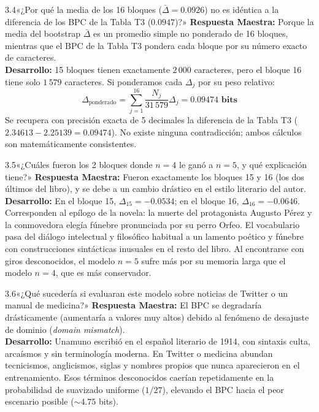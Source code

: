 \documentclass[11pt,letterpaper]{article}
\begin{document}
\begin{trapbox}{3.4}{«¿Por qué la media de los 16 bloques ($\bar{\Delta} = 0.0926$) no es idéntica a la diferencia de los BPC de la Tabla T3 ($0.0947$)?»}
\textbf{Respuesta Maestra:} Porque la media del bootstrap $\bar{\Delta}$ es un promedio simple no ponderado de 16 bloques, mientras que el BPC de la Tabla T3 pondera cada bloque por su número exacto de caracteres.\\[3pt]
\textbf{Desarrollo:} 15 bloques tienen exactamente $2\,000$ caracteres, pero el bloque 16 tiene solo $1\,579$ caracteres. Si ponderamos cada $\Delta_j$ por su peso relativo:
$$\Delta_{\text{ponderado}} = \sum_{j=1}^{16} \frac{N_j}{31\,579} \Delta_j = \mathbf{0.09474\text{ bits}}$$
Se recupera con precisión exacta de 5 decimales la diferencia de la Tabla T3 ($2.34613 - 2.25139 = 0.09474$). No existe ninguna contradicción; ambos cálculos son matemáticamente consistentes.
\end{trapbox}

\begin{trapbox}{3.5}{«¿Cuáles fueron los 2 bloques donde $n=4$ le ganó a $n=5$, y qué explicación tiene?»}
\textbf{Respuesta Maestra:} Fueron exactamente los bloques 15 y 16 (los dos últimos del libro), y se debe a un cambio drástico en el estilo literario del autor.\\[3pt]
\textbf{Desarrollo:} En el bloque 15, $\Delta_{15} = -0.0534$; en el bloque 16, $\Delta_{16} = -0.0646$. Corresponden al epílogo de la novela: la muerte del protagonista Augusto Pérez y la conmovedora elegía fúnebre pronunciada por su perro Orfeo. El vocabulario pasa del diálogo intelectual y filosófico habitual a un lamento poético y fúnebre con construcciones sintácticas inusuales en el resto del libro. Al encontrarse con giros desconocidos, el modelo $n=5$ sufre más por su memoria larga que el modelo $n=4$, que es más conservador.
\end{trapbox}

\begin{trapbox}{3.6}{«¿Qué sucedería si evaluaran este modelo sobre noticias de Twitter o un manual de medicina?»}
\textbf{Respuesta Maestra:} El BPC se degradaría drásticamente (aumentaría a valores muy altos) debido al fenómeno de desajuste de dominio (\textit{domain mismatch}).\\[3pt]
\textbf{Desarrollo:} Unamuno escribió en el español literario de 1914, con sintaxis culta, arcaísmos y sin terminología moderna. En Twitter o medicina abundan tecnicismos, anglicismos, siglas y nombres propios que nunca aparecieron en el entrenamiento. Esos términos desconocidos caerían repetidamente en la probabilidad de suavizado uniforme ($1/27$), elevando el BPC hacia el peor escenario posible ($\sim 4.75$ bits).
\end{trapbox}
\end{document}
